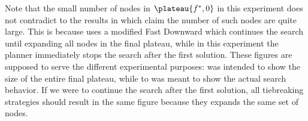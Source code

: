 Note that the small number of nodes in $\plateau{f^*,0}$ in this experiment does not contradict to the results in  which claim the number of such nodes are quite large.
This is because  uses a modified Fast Downward which continues the search until expanding all nodes in the final plateau, while in this experiment the planner immediately stops the search after the first solution. These figures are supposed to serve the different experimental purposes:  was intended to show the size of the entire final plateau, while  to  was meant to show the actual search behavior. If we were to continue the search after the first solution, all tiebreaking strategies should result in the same figure because they expands the same set of nodes.

